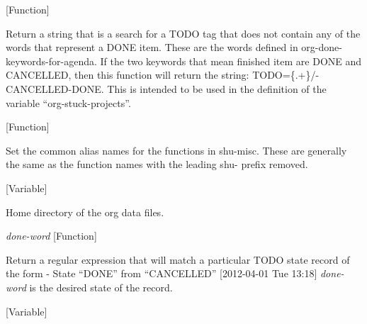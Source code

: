 \vspace{1em}
\noindent
{}
\usebox{\funcname}
 \hfill [Function]

\begin{doc-string}
Return a string that is a search for a TODO tag that does not contain any of the
words that represent a DONE item.  These are the words defined in org-done-keywords-for-agenda.
If the two keywords that mean finished item are DONE and CANCELLED, then this function will
return the string: TODO=\{.+\}/-CANCELLED-DONE.  This is intended to be used in the definition
of the variable ``org-stuck-projects''.
\end{doc-string}

\vspace{1em}
\noindent
{}
\usebox{\funcname}
 \hfill [Function]

\begin{doc-string}
Set the common alias names for the functions in shu-misc.
These are generally the same as the function names with the leading
shu- prefix removed.
\end{doc-string}

\vspace{1em}
\noindent
{}
\usebox{\funcname}
 \hfill [Variable]

\begin{doc-string}
Home directory of the org data files.
\end{doc-string}

\vspace{1em}
\noindent
{}
\usebox{\funcname}\emph{done-word}
 \hfill [Function]

\begin{doc-string}
Return a regular expression that will match a particular TODO state record of the form
   - State ``DONE''       from ``CANCELLED''  [2012-04-01 Tue 13:18]
  \emph{done-word} is the desired state of the record.
\end{doc-string}

\vspace{1em}
\noindent
{}
\usebox{\funcname}
 \hfill [Variable]

